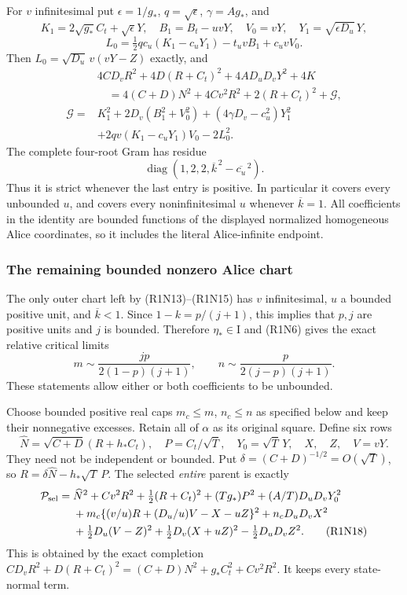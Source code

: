 For $v$ infinitesimal put $\epsilon=1/g_*$, $q=\sqrt\epsilon$,
$\gamma=Ag_*$, and
\[
 K_1=2\sqrt{g_*}C_t+\sqrt\epsilon Y,\quad
 B_1=B_t-uvY,\quad V_0=vY,\quad Y_1=\sqrt{\epsilon D_u}\,Y,
\]
\[
 L_0=\tfrac12qc_u(K_1-c_uY_1)-t_uvB_1+c_uvV_0.
\]
Then $L_0=\sqrt{D_u}\,v(vY-Z)$ exactly, and
\begin{align*}
 &4CD_vR^2+4D(R+C_t)^2+4AD_uD_vY^2+4K\\
 &\quad=4(C+D)N^2+4Cv^2R^2+2(R+C_t)^2+\mathcal G,\\
 \mathcal G={}&K_1^2+2D_v(B_1^2+V_0^2)
 +(4\gamma D_v-c_u^2)Y_1^2\\
 &+2qv(K_1-c_uY_1)V_0-2L_0^2 .
\tag{R1N14}
\end{align*}
The complete four-root Gram has residue
\[
 \operatorname{diag}(1,2,2,\overline{k}^{\,2}
                                      -\overline{c_u}^{\,2}).    \tag{R1N15}
\]
Thus it is strict whenever the last entry is positive.  In particular
it covers every unbounded $u$, and covers every noninfinitesimal
$u$ whenever $\overline k=1$.  All coefficients in the identity
are bounded functions of the displayed normalized homogeneous Alice
coordinates, so it includes the literal Alice-infinite endpoint.

\subsubsection*{The remaining bounded nonzero Alice chart}

The only outer chart left by (R1N13)--(R1N15) has $v$ infinitesimal,
$u$ a bounded positive unit, and $\overline k<1$.  Since
$1-k=p/(j+1)$, this implies that $p,j$ are positive units and $j$
is bounded.  Therefore $\eta_*\in\mathrm I$ and (R1N6) gives the
exact relative critical limits
\[
 m\sim\frac{jp}{2(1-p)(j+1)},\qquad
 n\sim\frac{p}{2(j-p)(j+1)}.                              \tag{R1N16}
\]
These statements allow either or both coefficients to be unbounded.

Choose bounded positive real caps $m_c\le m$, $n_c\le n$ as specified
below and keep their nonnegative excesses.  Retain all of $\alpha$
as its original square.  Define six rows
\[
 \widehat N=\sqrt{C+D}(R+h_*C_t),\quad
 P=C_t/\sqrt T,\quad Y_0=\sqrt T\,Y,\quad
 X,\quad Z,\quad V=vY.                                  \tag{R1N17}
\]
They need not be independent or bounded.  Put
$\delta=(C+D)^{-1/2}=O(\sqrt T)$, so
$R=\delta\widehat N-h_*\sqrt T\,P$.
The selected \emph{entire} parent is exactly
\begin{align*}
 \mathcal P_{\rm sel}={}&
 \widehat N^2+Cv^2R^2+\tfrac12(R+C_t)^2
       +(Tg_*)P^2+(A/T)D_uD_vY_0^2\\
 &+m_c\{(v/u)R+(D_u/u)V-X-uZ\}^2+n_cD_uD_vX^2\\
 &+\tfrac12D_u(V-Z)^2+\tfrac12D_v(X+uZ)^2
                                      -\tfrac12D_uD_vZ^2 .
\tag{R1N18}
\end{align*}
This is obtained by the exact completion
$CD_vR^2+D(R+C_t)^2=(C+D)N^2+g_*C_t^2+Cv^2R^2$.
It keeps every state-normal term.

